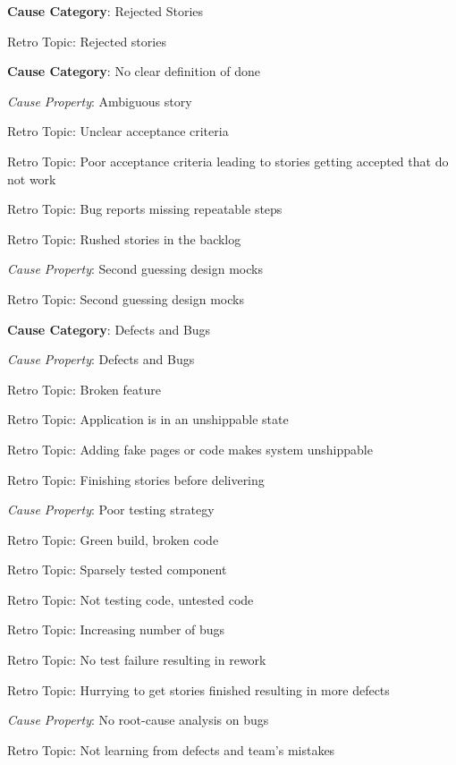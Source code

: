 \quad \textbf{Cause Category}: Rejected Stories

\quad \quad Retro Topic: Rejected stories

\quad \textbf{Cause Category}: No clear definition of done

\quad \quad \textit{Cause Property}: Ambiguous story

\quad \quad \quad Retro Topic: Unclear acceptance criteria

\quad \quad \quad Retro Topic: Poor acceptance criteria leading to stories getting accepted that do not work

\quad \quad \quad Retro Topic: Bug reports missing repeatable steps

\quad \quad \quad Retro Topic: Rushed stories in the backlog

\quad \quad \textit{Cause Property}: Second guessing design mocks

\quad \quad \quad Retro Topic: Second guessing design mocks

\quad \textbf{Cause Category}: Defects and Bugs

\quad \quad \textit{Cause Property}: Defects and Bugs

\quad \quad \quad Retro Topic: Broken feature

\quad \quad \quad Retro Topic: Application is in an unshippable state

\quad \quad \quad Retro Topic: Adding fake pages or code makes system unshippable

\quad \quad \quad Retro Topic: Finishing stories before delivering

\quad \quad \textit{Cause Property}: Poor testing strategy

\quad \quad \quad Retro Topic: Green build, broken code

\quad \quad \quad Retro Topic: Sparsely tested component

\quad \quad \quad Retro Topic: Not testing code, untested code

\quad \quad \quad Retro Topic: Increasing number of bugs

\quad \quad \quad Retro Topic: No test failure resulting in rework

\quad \quad \quad Retro Topic: Hurrying to get stories finished resulting in more defects

\quad \quad \textit{Cause Property}: No root-cause analysis on bugs

\quad \quad \quad Retro Topic: Not learning from defects and team's mistakes


